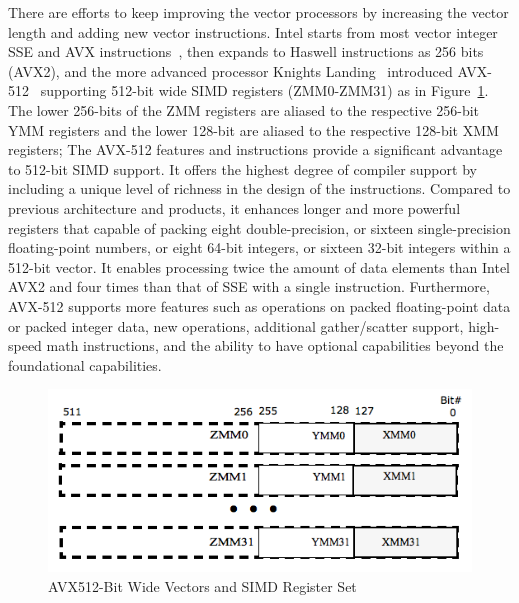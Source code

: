 \documentclass[sigconf]{acmart}
\begin{document}
There are efforts to keep improving the vector processors by increasing the vector
length and adding new vector instructions.
Intel starts from most vector integer SSE and AVX instructions~\cite{intel_sse, intel_avx, avxsets},
then expands to Haswell instructions as 256 bits (AVX2),
and the more advanced processor Knights Landing~\cite{avx-info} introduced
AVX-512~\cite{Intelref} supporting 512-bit wide SIMD registers (ZMM0-ZMM31)
as in Figure~\ref{fig:avx_mms}. The lower 256-bits of the ZMM registers are
aliased to the respective 256-bit YMM registers and the lower 128-bit are
aliased to the respective 128-bit XMM registers;
%
The AVX-512 features and instructions provide a significant advantage to 512-bit SIMD support.
It offers the highest degree of compiler support by including a unique level of richness
in the design of the instructions.
%
Compared to previous architecture and products, it enhances longer and more
powerful registers that capable of packing eight double-precision, or sixteen
single-precision floating-point numbers,
or eight 64-bit integers, or sixteen 32-bit integers within a 512-bit vector.
It enables processing twice the amount of data elements than Intel AVX2 and four
times than that of SSE with a single instruction.
%
Furthermore,  AVX-512 supports more features such as operations on packed
floating-point data or packed integer data, new operations, additional
gather/scatter support, high-speed math instructions, and the ability to have
optional capabilities beyond the foundational capabilities.

\begin{figure}[h]
    \centering
    \includegraphics[width=\linewidth]{avx_mms.png}
    \caption{AVX512-Bit Wide Vectors and SIMD Register Set}
    \label{fig:avx_mms}
\end{figure}
\end{document}
